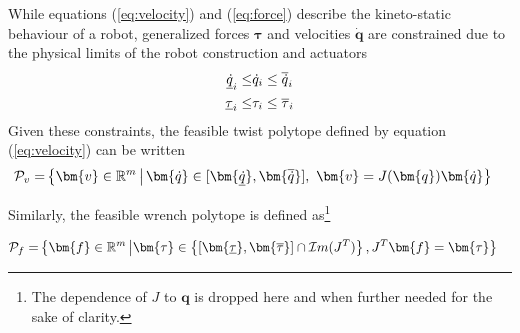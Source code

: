 While equations (\ref{eq:velocity}) and (\ref{eq:force}) describe the kineto-static behaviour of a robot, generalized forces $\bm{\tau}$ and velocities $\bm{\dot{q}}$ are constrained due to the physical limits of the robot construction and actuators
\begin{subequations}
\begin{align}
    \underline{{\dot{q}}}_{i} \leq & \dot{q}_i \leq \overline{{\dot{q}}}_{i} \label{eq:constraints_v}\\
    \underline{{\tau}}_{i} \leq &\tau_i \leq \overline{{\tau}}_{i}  \label{eq:constraints_f}
\end{align}   
\label{eq:constraints}
\end{subequations}
Given these constraints, the feasible twist polytope defined by equation (\ref{eq:velocity}) can be written
\begin{equation}
\begin{split}
    \mathcal{P}_v = & \left\{ \bm{v} \in \mathbb{R}^{m} \,\big| \, \bm{\dot{q}} \in [ \bm{\unum{\dot{q}}}, \bm{\onum{\dot{q}}} ],~\bm{v} = J(\bm{q})\bm{\dot{q}} \right\}
    \label{eq:polytope_v}
\end{split}
\end{equation}

Similarly, the feasible wrench polytope is defined as\footnote{The dependence of $J$ to $\bm{q}$ is dropped here and when further needed for the sake of clarity.}

\begin{equation}
\begin{split}
   \mathcal{P}_f = & \left\{ \bm{f} \in \mathbb{R}^{m}\,\big| \bm{\tau} \in \left\{[\bm{\unum{\tau}},\bm{\onum{\tau}}] \cap \mathcal{I}m(J^T)\right\},J^{T}\bm{f}=\bm{\tau} \right\}
 \label{eq:polytope_f}
\end{split}
\end{equation}


